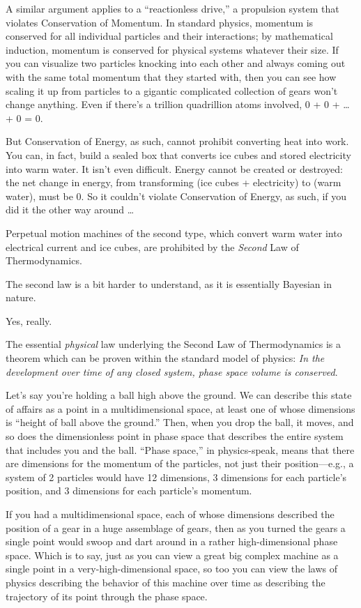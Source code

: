 {
 A similar argument applies to a ``reactionless
drive,'' a propulsion system that violates
Conservation of Momentum. In standard physics, momentum is conserved
for all individual particles and their interactions; by mathematical
induction, momentum is conserved for physical systems whatever their
size. If you can visualize two particles knocking into each other and
always coming out with the same total momentum that they started with,
then you can see how scaling it up from particles to a gigantic
complicated collection of gears won't change anything.
Even if there's a trillion quadrillion atoms involved,
0 + 0 + {\dots} + 0 = 0.}

{
 But Conservation of Energy, as such, cannot prohibit converting
heat into work. You can, in fact, build a sealed box that converts ice
cubes and stored electricity into warm water. It isn't
even difficult. Energy cannot be created or destroyed: the net change
in energy, from transforming (ice cubes + electricity) to (warm water),
must be 0. So it couldn't violate Conservation of
Energy, as such, if you did it the other way around \ldots}

{
 Perpetual motion machines of the second type, which convert warm
water into electrical current and ice cubes, are prohibited by the
\textit{Second} Law of Thermodynamics.}

{
 The second law is a bit harder to understand, as it is essentially
Bayesian in nature.}

{
 Yes, really.}

{
 The essential \textit{physical} law underlying the Second Law of
Thermodynamics is a theorem which can be proven within the standard
model of physics: \textit{In the development over time of any closed
system, phase space volume is conserved}.}

{
 Let's say you're holding a ball
high above the ground. We can describe this state of affairs as a point
in a multidimensional space, at least one of whose dimensions is
``height of ball above the ground.''
Then, when you drop the ball, it moves, and so does the dimensionless
point in phase space that describes the entire system that includes you
and the ball. ``Phase space,'' in
physics-speak, means that there are dimensions for the momentum of the
particles, not just their position---e.g., a system of 2 particles
would have 12 dimensions, 3 dimensions for each
particle's position, and 3 dimensions for each
particle's momentum.}

{
 If you had a multidimensional space, each of whose dimensions
described the position of a gear in a huge assemblage of gears, then as
you turned the gears a single point would swoop and dart around in a
rather high-dimensional phase space. Which is to say, just as you can
view a great big complex machine as a single point in a
very-high-dimensional space, so too you can view the laws of physics
describing the behavior of this machine over time as describing the
trajectory of its point through the phase space.}


